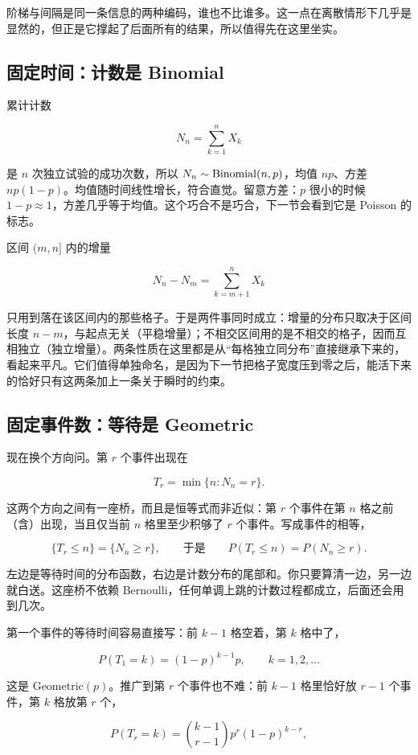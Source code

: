 阶梯与间隔是同一条信息的两种编码，谁也不比谁多。这一点在离散情形下几乎是显然的，但正是它撑起了后面所有的结果，所以值得先在这里坐实。

\subsection{固定时间：计数是 Binomial}

累计计数

\[
N_n=\sum_{k=1}^{n}X_k
\]

是 \(n\) 次独立试验的成功次数，所以 \(N_n\sim\operatorname{Binomial}(n,p)\)，均值 \(np\)、方差 \(np(1-p)\)。均值随时间线性增长，符合直觉。留意方差：\(p\) 很小的时候 \(1-p\approx1\)，方差几乎等于均值。这个巧合不是巧合，下一节会看到它是 Poisson 的标志。

区间 \((m,n]\) 内的增量

\[
N_n-N_m=\sum_{k=m+1}^{n}X_k
\]

只用到落在该区间内的那些格子。于是两件事同时成立：增量的分布只取决于区间长度 \(n-m\)，与起点无关（平稳增量）；不相交区间用的是不相交的格子，因而互相独立（独立增量）。两条性质在这里都是从``每格独立同分布''直接继承下来的，看起来平凡。它们值得单独命名，是因为下一节把格子宽度压到零之后，能活下来的恰好只有这两条加上一条关于瞬时的约束。

\subsection{固定事件数：等待是 Geometric}

现在换个方向问。第 \(r\) 个事件出现在

\[
T_r=\min\{n:N_n=r\}.
\]

这两个方向之间有一座桥，而且是恒等式而非近似：第 \(r\) 个事件在第 \(n\) 格之前（含）出现，当且仅当前 \(n\) 格里至少积够了 \(r\) 个事件。写成事件的相等，

\[
\{T_r\le n\}=\{N_n\ge r\},
\qquad\text{于是}\qquad
P(T_r\le n)=P(N_n\ge r).
\]

左边是等待时间的分布函数，右边是计数分布的尾部和。你只要算清一边，另一边就白送。这座桥不依赖 Bernoulli，任何单调上跳的计数过程都成立，后面还会用到几次。

第一个事件的等待时间容易直接写：前 \(k-1\) 格空着，第 \(k\) 格中了，

\[
P(T_1=k)=(1-p)^{k-1}p,\qquad k=1,2,\ldots
\]

这是 Geometric\((p)\)。推广到第 \(r\) 个事件也不难：前 \(k-1\) 格里恰好放 \(r-1\) 个事件，第 \(k\) 格放第 \(r\) 个，

\[
P(T_r=k)=\binom{k-1}{r-1}p^{r}(1-p)^{k-r},
\]

